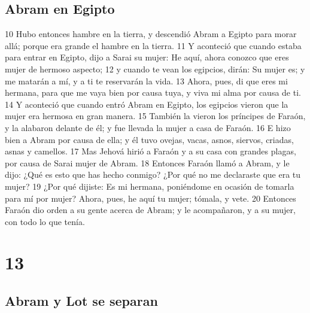 \section{Abram en Egipto}

10 Hubo entonces hambre en la tierra, y descendió Abram a Egipto para morar allá; porque era grande el hambre en la tierra.
11 Y aconteció que cuando estaba para entrar en Egipto, dijo a Sarai su mujer: He aquí, ahora conozco que eres mujer de hermoso aspecto;
12 y cuando te vean los egipcios, dirán: Su mujer es; y me matarán a mí, y a ti te reservarán la vida.
13 Ahora, pues, di que eres mi hermana, para que me vaya bien por causa tuya, y viva mi alma por causa de ti.
14 Y aconteció que cuando entró Abram en Egipto, los egipcios vieron que la mujer era hermosa en gran manera.
15 También la vieron los príncipes de Faraón, y la alabaron delante de él; y fue llevada la mujer a casa de Faraón.
16 E hizo bien a Abram por causa de ella; y él tuvo ovejas, vacas, asnos, siervos, criadas, asnas y camellos.
17 Mas Jehová hirió a Faraón y a su casa con grandes plagas, por causa de Sarai mujer de Abram.
18 Entonces Faraón llamó a Abram, y le dijo: ¿Qué es esto que has hecho conmigo? ¿Por qué no me declaraste que era tu mujer?
19 ¿Por qué dijiste: Es mi hermana, poniéndome en ocasión de tomarla para mí por mujer? Ahora, pues, he aquí tu mujer; tómala, y vete.
20 Entonces Faraón dio orden a su gente acerca de Abram; y le acompañaron, y a su mujer, con todo lo que tenía.

\chapter{13}

\section{Abram y Lot se separan}

